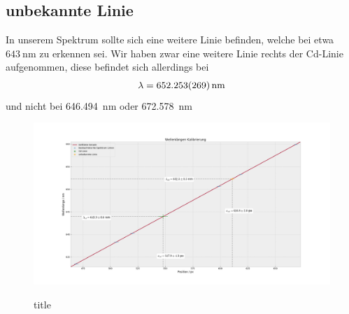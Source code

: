     \subsection{unbekannte Linie}
      In unserem Spektrum sollte sich eine weitere Linie befinden, welche bei etwa $\SI{643}{\nano\metre}$ zu erkennen sei. Wir haben zwar eine weitere Linie rechts der Cd-Linie aufgenommen, diese befindet sich allerdings bei
      \begin{align}
        \lambda = \SI{652.253+-0.269}{nm}
      \end{align}
      und nicht bei \SI{646.494}{nm} oder \SI{672.578}{nm}



    \begin{landscape}
      \thispagestyle{empty}
      \begin{figure}
        \vspace*{-2cm}
        \caption{title}
        \hspace*{-6cm}\includegraphics[width=1.5\paperwidth]{Auswertung/wavelength_analysis/wl_ne_cal}
        \label{plt::6}
      \end{figure}
    \end{landscape}
